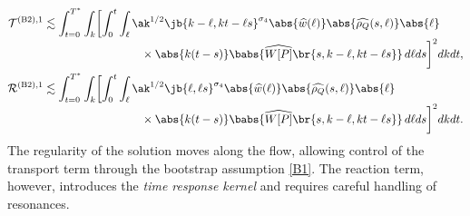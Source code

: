 \begin{align*}
\mathcal{T}^{\mathrm{(B2),1}}&\lesssim\int_{t=0}^{T^*}\int_k\biggl[\int_0^t\int_\ell\ak^{1/2}\jb{k-\ell,kt-\ell s}^{\sigma_4}\abs{\widehat w(\ell)}\abs{\widehat{\rho_Q}(s,\ell)} \abs{\ell}\\[-3pt]
&\hspace{3cm}\times\abs{k(t-s)}\babs{\widehat {W[P]}\br{s,k-\ell,kt-\ell s}}\,d\ell ds\biggr]^2dkdt,\\
\mathcal{R}^{\mathrm{(B2),1}}&\lesssim\int_{t=0}^{T^*}\int_k\biggl[\int_0^t\int_\ell\ak^{1/2}\jb{\ell,\ell s}^{\sigma_4}\abs{\widehat w(\ell)}\abs{\widehat{\rho_Q}(s,\ell)} \abs{\ell}\\[-3pt]
&\hspace{3cm}\times\abs{k(t-s)}\babs{\widehat {W[P]}\br{s,k-\ell,kt-\ell s}}\,d\ell ds\biggr]^2dkdt.
\end{align*}The regularity of the solution moves along the flow, allowing control of the transport term through the bootstrap assumption \eqref{B1}. The reaction term, however, introduces the \textit{time response kernel} and requires careful handling of resonances.

